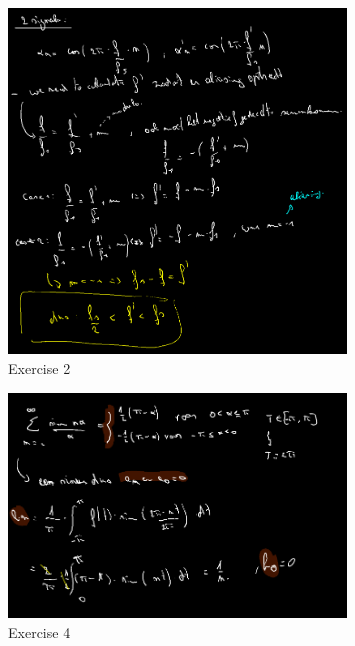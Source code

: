 \documentclass[a4paper]{report}
\begin{document}
\begin{figure}[H]
	\centering
	\includegraphics[width=0.8\textwidth]{assets/wc_9_ex_2.png}
	\caption{Exercise 2}
	\label{fig:wc_9_ex_2}
\end{figure}



\begin{figure}[H]
	\centering
	\includegraphics[width=0.8\textwidth]{assets/wc_9_ex_4.png}
	\caption{Exercise 4}
	\label{fig:wc_9_ex_4}
\end{figure}


\end{document}
